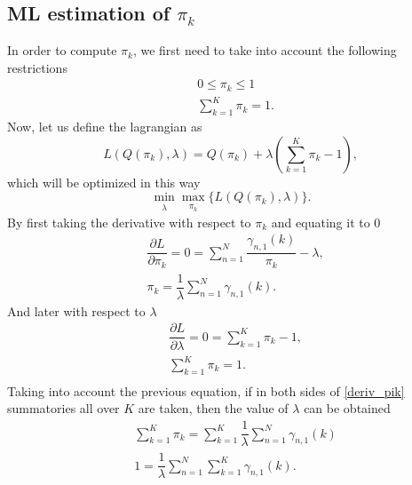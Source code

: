 \documentclass[12pt]{article}
\begin{document}
\subsection{ML estimation of $\pi_{k}$}
In order to compute $\pi_{k}$, we first need to take into account the following restrictions
\begin{align}
& 0 \leq \pi_{k} \leq 1 \\
& \sum\limits_{k = 1}^{K} \pi_{k} = 1.
\end{align}
Now, let us define the lagrangian as
\begin{equation}
\label{lagrange_pik}
L\left( Q(\pi_{k}),\lambda \right) = Q(\pi_{k}) + \lambda \left( \sum \limits_{k=1}^{K} \pi_{k} - 1 \right),
\end{equation}
which will be optimized in this way
\begin{equation}
\label{minmax_lagrange_pik}
\min_{\substack{\lambda}} \max_{\substack{\pi_{k}}} \lbrace L\left( Q(\pi_{k}),\lambda \right) \rbrace.
\end{equation}
By first taking the derivative with respect to $\pi_{k}$ and equating it to 0
\begin{equation}
\label{deriv_pik}
\begin{split}
& \dfrac{\partial L}{\partial \pi_{k}} = 0 = \sum \limits_{n=1}^{N} \dfrac{\gamma_{n,1}(k)}{\pi_{k}} - \lambda, \\
& \pi_{k} = \dfrac{1}{\lambda} \sum \limits_{n=1}^{N} \gamma_{n,1}(k).
\end{split}
\end{equation}
And later with respect to $\lambda$
\begin{equation}
\begin{split}
& \dfrac{\partial L}{\partial \lambda} = 0 = \sum \limits_{k=1}^{K} \pi_{k} - 1,\\
& \sum \limits_{k=1}^{K} \pi_{k} = 1.\\
\end{split}
\end{equation}
Taking into account the previous equation, if in both sides of \eqref{deriv_pik} summatories all over $K$ are taken, then the value of $\lambda$ can be obtained
\begin{equation}
\begin{split}
& \sum \limits_{k=1}^{K}\pi_{k} = \sum \limits_{k=1}^{K} \dfrac{1}{\lambda} \sum \limits_{n=1}^{N} \gamma_{n,1}(k)\\
& 1 = \dfrac{1}{\lambda} \sum \limits_{n=1}^{N}\sum \limits_{k=1}^{K}\gamma_{n,1}(k).\\
\end{split}
\end{equation}
\end{document}
